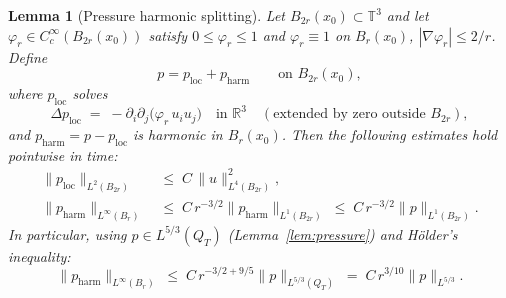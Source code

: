 \documentclass[11pt]{article}
\newtheorem{lemma}[theorem]{Lemma}
\theoremstyle{definition}
\theoremstyle{remark}
\newcommand{\T}{\mathbb{T}}
\begin{document}
\begin{lemma}[Pressure harmonic splitting]\label{lem:pressure-harmonic-split}
  Let $B_{2r}(x_0)\subset\T^3$ and let $\varphi_r\in C_c^\infty(B_{2r}(x_0))$
  satisfy $0\leq\varphi_r\leq 1$ and $\varphi_r\equiv 1$ on $B_r(x_0)$,
  $|\nabla\varphi_r|\leq 2/r$.  Define
  \begin{equation}\label{eq:p-split}
    p = p_{\mathrm{loc}} + p_{\mathrm{harm}} \qquad\text{on } B_{2r}(x_0),
  \end{equation}
  where $p_{\mathrm{loc}}$ solves
  \[
    \Delta p_{\mathrm{loc}} \;=\; -\partial_i\partial_j\!\bigl(\varphi_r\,u_i u_j\bigr)
    \quad\text{in }\mathbb{R}^3\quad(\text{extended by zero outside }B_{2r}),
  \]
  and $p_{\mathrm{harm}} = p - p_{\mathrm{loc}}$ is harmonic in $B_r(x_0)$.
  Then the following estimates hold pointwise in time:
  \begin{align}
    \|p_{\mathrm{loc}}\|_{L^2(B_{2r})}
    &\;\leq\; C\,\|u\|_{L^4(B_{2r})}^2,
    \label{eq:p-loc-est}\\
    \|p_{\mathrm{harm}}\|_{L^\infty(B_r)}
    &\;\leq\; C\,r^{-3/2}\|p_{\mathrm{harm}}\|_{L^1(B_{2r})}
      \;\leq\; C\,r^{-3/2}\|p\|_{L^1(B_{2r})}.
    \label{eq:p-harm-infty}
  \end{align}
  In particular, using $p\in L^{5/3}(Q_T)$
  (Lemma~\ref{lem:pressure}) and H\"{o}lder's inequality:
  \begin{equation}\label{eq:p-harm-holder}
    \|p_{\mathrm{harm}}\|_{L^\infty(B_r)}
    \;\leq\; C\,r^{-3/2+9/5}\|p\|_{L^{5/3}(Q_T)}
    \;=\; C\,r^{3/10}\|p\|_{L^{5/3}}.
  \end{equation}
\end{lemma}
\end{document}
